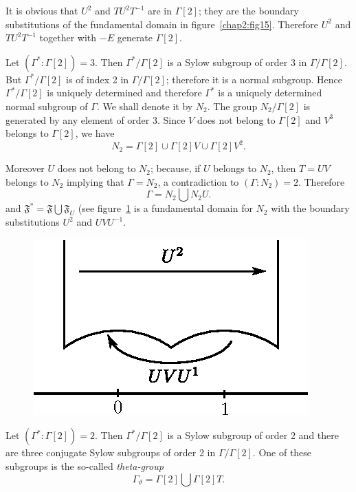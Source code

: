 It is obvious that $U^2$ and $TU^2T^{-1}$ are in $\Gamma [2]$;
they are the boundary substitutions of the fundamental domain in
figure~\ref{chap2:fig15}. Therefore $U^2$ and $TU^2T^{-1}$ together with $-E$
generate $\Gamma[2]$.

Let $(\Gamma^{\ast}:\Gamma[2])=3$. Then
$\Gamma^{\ast}/\Gamma[2]$ is a Sylow subgroup of order 3 in
$\Gamma/\Gamma[2]$. But $\Gamma^{\ast}/\Gamma [2]$ is of
index 2 in $\Gamma/\Gamma[2]$; therefore it is a normal
subgroup. Hence $\Gamma^{\ast}/\Gamma[2]$ is uniquely determined
and therefore $\Gamma^{\ast}$ is a uniquely determined normal subgroup
of $\Gamma$. We shall denote it by $N_2$. The group $N_2/\Gamma
[2]$ is generated by any element of order 3. Since $V$ does not
belong to $\Gamma[2]$ and $V^3$ belongs to $\Gamma[2]$, we
have 
$$
N_2 = \Gamma[2] \cup \Gamma[2] V \cup \Gamma [2] V^2.
$$

Moreover $U$ does not belong to $N_2$; because, if $U$ belongs to
$N_2$, then $T=UV$ \pageoriginale belongs to $N_2$ implying that
$\Gamma=N_2$, a contradiction to $(\Gamma:N_2)=2$. Therefore 
$$
\Gamma = N_2 \bigcup N_2 U. 
$$
and $\mathfrak{F}^{\ast}=\mathfrak{F}\bigcup \mathfrak{F}_U$ (see
figure~\ref{chap2:fig16} is a fundamental domain for $N_2$ with the 
boundary substitutions $U^2$ and $U V U^{-1}$.
\begin{figure}[H]
\centering
\includegraphics{vol29-fig/fig29-16.eps}
\smallskip
\caption{}
\label{chap2:fig16}
\end{figure}

Let $(\Gamma^{\ast}:\Gamma[2])=2$. Then
$\Gamma^{\ast}/\Gamma[2]$ is a Sylow subgroup of order 2 and
there are three conjugate Sylow subgroups of order 2 in $\Gamma/\Gamma
[2]$. One of these subgroups is the so-called \textit{theta-group}
$$
\Gamma_{\vartheta} = \Gamma [2] \bigcup \Gamma[2]T.
$$

